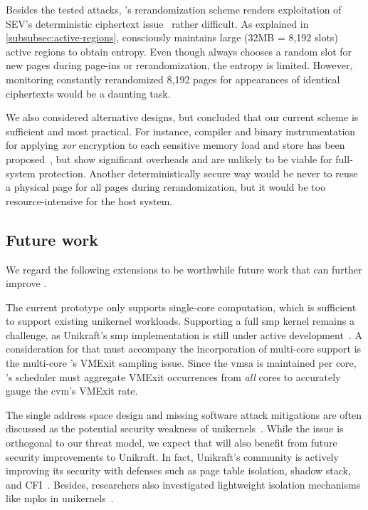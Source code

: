 \label{subsec:ar-size}
Besides the tested attacks, \thename's rerandomization scheme renders exploitation of SEV's deterministic ciphertext issue~\cite{li2021cipherleaks} rather difficult.
As explained in \cref{subsubsec:active-regions}, \thename consciously maintains large (32MB = 8,192 slots) active regions to obtain entropy.
Even though \thename always chooses a random slot for new pages during page-ins or rerandomization, the entropy is limited.
However, monitoring constantly rerandomized 8,192 pages for appearances of identical ciphertexts would be a daunting task.

We also considered alternative designs, but concluded that our current scheme is sufficient and most practical.
For instance, compiler and binary instrumentation for applying \emph{xor} encryption to each sensitive memory load and store has been proposed~\cite{cipherfix,obelix}, but show significant overheads and are unlikely to be viable for full-system protection.
Another deterministically secure way would be never to reuse a physical page for all pages during rerandomization, but it would be too resource-intensive for the host system.


\subsection{Future work}
We regard the following extensions to be worthwhile future work that can further improve \thename.

The current prototype only supports single-core computation, which is sufficient to support existing unikernel workloads.
Supporting a full \gls{smp} kernel remains a challenge, as Unikraft's \gls{smp} implementation is still under active development~\cite{unikraft-smp}.
A consideration for \thename that must accompany the incorporation of multi-core support is the multi-core \thename's VMExit sampling issue. Since the \gls{vmsa} is maintained per core, \thename's scheduler must aggregate VMExit occurrences from \emph{all} cores to accurately gauge the \gls{cvm}'s VMExit rate.



The single address space design and missing software attack mitigations are often discussed as the potential security weakness of unikernels~\cite{intra-unikernel}.
While the issue is orthogonal to our threat model, we expect that \thename will also benefit from future security improvements to Unikraft.
In fact, Unikraft’s community is actively improving its security with defenses such as page table isolation, shadow stack, and CFI~\cite{unikraft-security}.
Besides, researchers also investigated lightweight isolation mechanisms like \glspl{mpk} in unikernels~\cite{lefeuvre2022flexos,intra-unikernel,sartakov2021cubicleos}.

